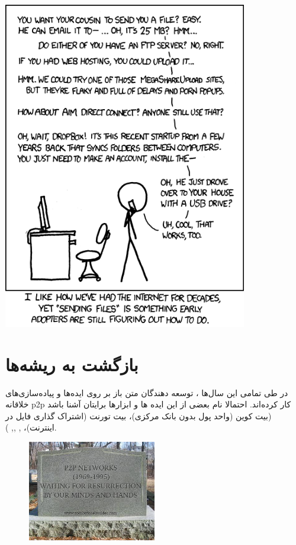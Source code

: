 \documentclass[]{article}
\begin{document}
\begin{center}
\includegraphics[width=0.8\textwidth]{images/file_transfer.png}
\end{center}


\section*{{\titr بازگشت به ریشه‌ها}}


در طی تمامی این سال‌ها ، توسعه دهندگان متن باز   بر روی ایده‌ها و پیاده‌سازی‌های خلاقانه p2p کار کرده‌اند. احتمالا نام بعضی از این ایده ها و ابزارها برایتان آشنا باشد (بیت کوین (واحد پول بدون بانک مرکزی)، بیت تورنت (اشتراک گذاری فایل در اینترنت)،  ,    ,, ).


\begin{figure}\centering
\includegraphics[width=0.5\textwidth]{images/i1.png}
\end{figure}
\end{document}
